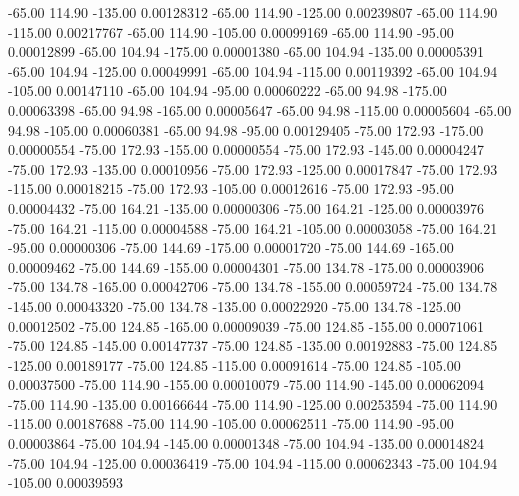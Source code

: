     -65.00    114.90   -135.00     0.00128312
    -65.00    114.90   -125.00     0.00239807
    -65.00    114.90   -115.00     0.00217767
    -65.00    114.90   -105.00     0.00099169
    -65.00    114.90    -95.00     0.00012899
    -65.00    104.94   -175.00     0.00001380
    -65.00    104.94   -135.00     0.00005391
    -65.00    104.94   -125.00     0.00049991
    -65.00    104.94   -115.00     0.00119392
    -65.00    104.94   -105.00     0.00147110
    -65.00    104.94    -95.00     0.00060222
    -65.00     94.98   -175.00     0.00063398
    -65.00     94.98   -165.00     0.00005647
    -65.00     94.98   -115.00     0.00005604
    -65.00     94.98   -105.00     0.00060381
    -65.00     94.98    -95.00     0.00129405
    -75.00    172.93   -175.00     0.00000554
    -75.00    172.93   -155.00     0.00000554
    -75.00    172.93   -145.00     0.00004247
    -75.00    172.93   -135.00     0.00010956
    -75.00    172.93   -125.00     0.00017847
    -75.00    172.93   -115.00     0.00018215
    -75.00    172.93   -105.00     0.00012616
    -75.00    172.93    -95.00     0.00004432
    -75.00    164.21   -135.00     0.00000306
    -75.00    164.21   -125.00     0.00003976
    -75.00    164.21   -115.00     0.00004588
    -75.00    164.21   -105.00     0.00003058
    -75.00    164.21    -95.00     0.00000306
    -75.00    144.69   -175.00     0.00001720
    -75.00    144.69   -165.00     0.00009462
    -75.00    144.69   -155.00     0.00004301
    -75.00    134.78   -175.00     0.00003906
    -75.00    134.78   -165.00     0.00042706
    -75.00    134.78   -155.00     0.00059724
    -75.00    134.78   -145.00     0.00043320
    -75.00    134.78   -135.00     0.00022920
    -75.00    134.78   -125.00     0.00012502
    -75.00    124.85   -165.00     0.00009039
    -75.00    124.85   -155.00     0.00071061
    -75.00    124.85   -145.00     0.00147737
    -75.00    124.85   -135.00     0.00192883
    -75.00    124.85   -125.00     0.00189177
    -75.00    124.85   -115.00     0.00091614
    -75.00    124.85   -105.00     0.00037500
    -75.00    114.90   -155.00     0.00010079
    -75.00    114.90   -145.00     0.00062094
    -75.00    114.90   -135.00     0.00166644
    -75.00    114.90   -125.00     0.00253594
    -75.00    114.90   -115.00     0.00187688
    -75.00    114.90   -105.00     0.00062511
    -75.00    114.90    -95.00     0.00003864
    -75.00    104.94   -145.00     0.00001348
    -75.00    104.94   -135.00     0.00014824
    -75.00    104.94   -125.00     0.00036419
    -75.00    104.94   -115.00     0.00062343
    -75.00    104.94   -105.00     0.00039593
